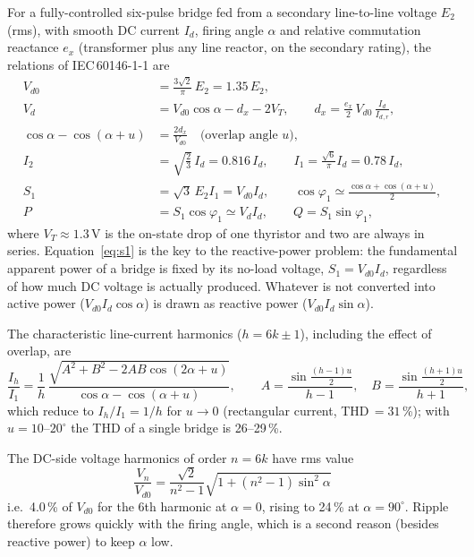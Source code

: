 \documentclass[11pt,a4paper]{article}
\newcommand{\Vdo}{V_{d0}}
\newcommand{\Id}{I_d}
\newcommand{\ex}{e_x}
\newcommand{\dx}{d_x}
\newcommand{\Ell}{E_{2}}
\begin{document}
For a fully-controlled six-pulse bridge fed from a secondary line-to-line voltage $\Ell$ (rms), with smooth DC current $\Id$, firing angle $\alpha$ and relative commutation reactance $\ex$ (transformer plus any line reactor, on the secondary rating), the relations of IEC\,60146-1-1 \cite{iec60146} are
\begin{align}
\Vdo &= \frac{3\sqrt2}{\pi}\,\Ell = 1.35\,\Ell, \label{eq:vd0}\\
V_d &= \Vdo\cos\alpha - \dx - 2V_T, \qquad \dx = \frac{\ex}{2}\,\Vdo\,\frac{\Id}{\Id{}_{,r}}, \label{eq:vd}\\
\cos\alpha - \cos(\alpha+u) &= \frac{2\dx}{\Vdo}\quad\text{(overlap angle $u$)}, \label{eq:overlap}\\
I_2 &= \sqrt{\tfrac23}\,\Id = 0.816\,\Id, \qquad I_{1} = \frac{\sqrt6}{\pi}\Id = 0.78\,\Id, \label{eq:i2}\\
S_1 &= \sqrt3\,\Ell I_1 = \Vdo\Id, \qquad \cos\varphi_1 \simeq \frac{\cos\alpha + \cos(\alpha+u)}{2}, \label{eq:s1}\\
P &= S_1\cos\varphi_1 \simeq V_d\Id, \qquad Q = S_1\sin\varphi_1, \label{eq:pq}
\end{align}
where $V_T \approx 1.3$\,V is the on-state drop of one thyristor and two are always in series. Equation~\eqref{eq:s1} is the key to the reactive-power problem: the fundamental apparent power of a bridge is fixed by its no-load voltage, $S_1 = \Vdo \Id$, regardless of how much DC voltage is actually produced. Whatever is not converted into active power ($\Vdo\Id\cos\alpha$) is drawn as reactive power ($\Vdo\Id\sin\alpha$).

The characteristic line-current harmonics ($h = 6k \pm 1$), including the effect of overlap, are \cite{iec60146,kimbark}
\begin{equation}
\frac{I_h}{I_1} = \frac{1}{h}\,
\frac{\sqrt{A^2 + B^2 - 2AB\cos(2\alpha+u)}}{\cos\alpha - \cos(\alpha+u)},\qquad
A = \frac{\sin\frac{(h-1)u}{2}}{h-1},\quad B = \frac{\sin\frac{(h+1)u}{2}}{h+1},
\label{eq:harm}
\end{equation}
which reduce to $I_h/I_1 = 1/h$ for $u \to 0$ (rectangular current, THD\,$= 31$\,\%); with $u = 10$--$20^\circ$ the THD of a single bridge is 26--29\,\%.

The DC-side voltage harmonics of order $n = 6k$ have rms value \cite{kimbark}
\begin{equation}
\frac{V_n}{\Vdo} = \frac{\sqrt2}{n^2-1}\sqrt{1 + (n^2-1)\sin^2\alpha}
\label{eq:vripple}
\end{equation}
i.e.\ 4.0\,\% of $\Vdo$ for the 6th harmonic at $\alpha = 0$, rising to 24\,\% at $\alpha = 90^\circ$. Ripple therefore grows quickly with the firing angle, which is a second reason (besides reactive power) to keep $\alpha$ low.
\end{document}
